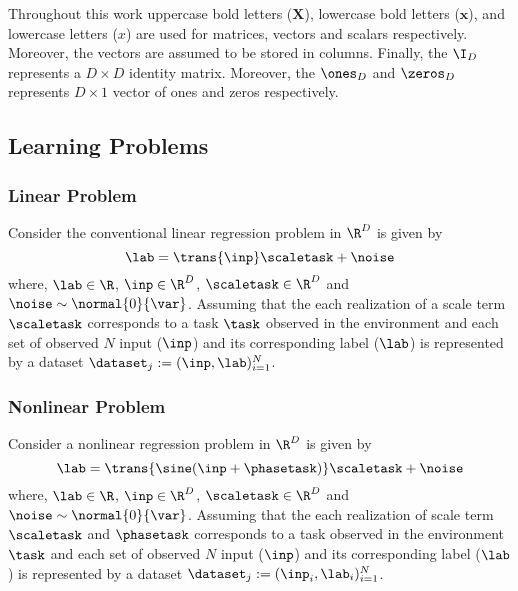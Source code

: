 Throughout this work uppercase bold letters (\eg $\mathbf{X}$), lowercase bold letters (\eg $\mathbf{x}$), and lowercase letters (\eg ${x}$) are used for matrices, vectors and scalars respectively. Moreover, the vectors are assumed to be stored in columns. Finally, the $\I_{D}$ represents a $D\times D$ identity matrix. Moreover, the $\ones_{D}$ and $\zeros_{D}$ represents $D\times 1$ vector of ones and zeros respectively.

\subsection{Learning Problems}

\subsubsection{Linear Problem}\label{sec:Linear}

Consider the conventional linear regression problem in $\R^D$ is given by
\begin{equation}\label{eq:linearreg}
  \lab = \trans{\inp}\scaletask+\noise
\end{equation}
where, $\lab\in\R$, $\inp\in\R^D$, $\scaletask\in\R^D$ and $\noise\sim\normal{0}{\var}$. Assuming that the each realization of a scale term $\scaletask$ corresponds to a task $\task$  observed in the environment and each set of observed $N$ input ($\inp$) and its corresponding label ($\lab$) is represented by a dataset $\dataset_{j}:=(\inp, \lab)_{i=1}^{N}$. 

\subsubsection{Nonlinear Problem}\label{sec:Nonlinear}

Consider a nonlinear regression problem in $\R^D$ is given by
\begin{equation}\label{eq:nonlinearreg}
  \lab = \trans{\sine(\inp+\phasetask)}\scaletask+\noise
\end{equation}
where, $\lab\in\R$, $\inp\in\R^D$, $\scaletask\in\R^D$ and $\noise\sim\normal{0}{\var}$. Assuming that the each realization of scale term $\scaletask$ and $\phasetask$ corresponds to a task observed in the environment $\task$ and each set of observed $N$ input ($\inp$) and its corresponding label ($\lab$) is represented by a dataset $\dataset_{j}:=(\inp_i, \lab_i)_{i=1}^{N}$.

